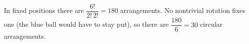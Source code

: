 In fixed positions there are $\dfrac{6!}{2!\,2!}=180$ arrangements. No nontrivial rotation fixes one (the blue ball would have to stay put), so there are $\dfrac{180}{6}=\boxed{30}$ circular arrangements.
